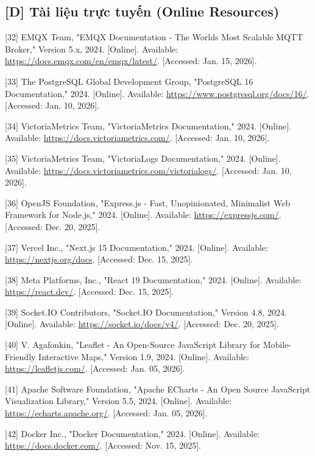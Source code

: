 \documentclass[a4paper]{extarticle}
\begin{document}
\subsection{{[}D{]} Tài liệu trực tuyến (Online
Resources)}\label{d-tuxe0i-liux1ec7u-trux1ef1c-tuyux1ebfn-online-resources}

{[}32{]} EMQX Team, "EMQX Documentation - The World\textquotesingle s
Most Scalable MQTT Broker," Version 5.x, 2024. {[}Online{]}. Available:
\url{https://docs.emqx.com/en/emqx/latest/}. {[}Accessed: Jan. 15,
2026{]}.

{[}33{]} The PostgreSQL Global Development Group, "PostgreSQL 16
Documentation," 2024. {[}Online{]}. Available:
\url{https://www.postgresql.org/docs/16/}. {[}Accessed: Jan. 10,
2026{]}.

{[}34{]} VictoriaMetrics Team, "VictoriaMetrics Documentation," 2024.
{[}Online{]}. Available: \url{https://docs.victoriametrics.com/}.
{[}Accessed: Jan. 10, 2026{]}.

{[}35{]} VictoriaMetrics Team, "VictoriaLogs Documentation," 2024.
{[}Online{]}. Available:
\url{https://docs.victoriametrics.com/victorialogs/}. {[}Accessed: Jan.
10, 2026{]}.

{[}36{]} OpenJS Foundation, "Express.js - Fast, Unopinionated,
Minimalist Web Framework for Node.js," 2024. {[}Online{]}. Available:
\url{https://expressjs.com/}. {[}Accessed: Dec. 20, 2025{]}.

{[}37{]} Vercel Inc., "Next.js 15 Documentation," 2024. {[}Online{]}.
Available: \url{https://nextjs.org/docs}. {[}Accessed: Dec. 15, 2025{]}.

{[}38{]} Meta Platforms, Inc., "React 19 Documentation," 2024.
{[}Online{]}. Available: \url{https://react.dev/}. {[}Accessed: Dec. 15,
2025{]}.

{[}39{]} Socket.IO Contributors, "Socket.IO Documentation," Version 4.8,
2024. {[}Online{]}. Available: \url{https://socket.io/docs/v4/}.
{[}Accessed: Dec. 20, 2025{]}.

{[}40{]} V. Agafonkin, "Leaflet - An Open-Source JavaScript Library for
Mobile-Friendly Interactive Maps," Version 1.9, 2024. {[}Online{]}.
Available: \url{https://leafletjs.com/}. {[}Accessed: Jan. 05, 2026{]}.

{[}41{]} Apache Software Foundation, "Apache ECharts - An Open Source
JavaScript Visualization Library," Version 5.5, 2024. {[}Online{]}.
Available: \url{https://echarts.apache.org/}. {[}Accessed: Jan. 05,
2026{]}.

{[}42{]} Docker Inc., "Docker Documentation," 2024. {[}Online{]}.
Available: \url{https://docs.docker.com/}. {[}Accessed: Nov. 15,
2025{]}.
\end{document}
